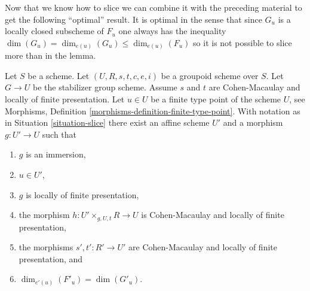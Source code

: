 \noindent
Now that we know how to slice we can combine it with the preceding material
to get the following ``optimal'' result. It is optimal in the sense that
since $G_u$ is a locally closed subscheme of $F_u$ one always has the
inequality $\dim(G_u) = \dim_{e(u)}(G_u) \leq \dim_{e(u)}(F_u)$ so it
is not possible to slice more than in the lemma.

\begin{lemma}
\label{lemma-max-slice}
Let $S$ be a scheme.
Let $(U, R, s, t, c, e, i)$ be a groupoid scheme over $S$.
Let $G \to U$ be the stabilizer group scheme.
Assume $s$ and $t$ are Cohen-Macaulay and locally of finite presentation.
Let $u \in U$ be a finite type point of the scheme $U$, see
Morphisms, Definition \ref{morphisms-definition-finite-type-point}.
With notation as in
Situation \ref{situation-slice}
there exist an affine scheme $U'$ and a morphism $g : U' \to U$ such that
\begin{enumerate}
\item $g$ is an immersion,
\item $u \in U'$,
\item $g$ is locally of finite presentation,
\item the morphism $h : U' \times_{g, U, t} R \longrightarrow U$
is Cohen-Macaulay and locally of finite presentation,
\item the morphisms $s', t' : R' \to U'$ are Cohen-Macaulay and
locally of finite presentation, and
\item $\dim_{e'(u)}(F'_u) = \dim(G'_u)$.
\end{enumerate}
\end{lemma}

